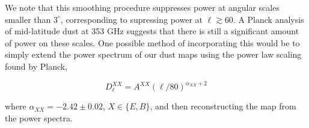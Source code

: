 \documentclass[twoside,10pt]{article}
\begin{document}
We note that this smoothing procedure suppresses power at angular scales
smaller than $3^\circ$, corresponding to supressing power at $\ell \gtrsim
60$. A Planck analysis\cite{planck_collaboration_planck_2014-2} of
mid-latitude dust at 353 GHz suggests that there is still a significant amount
of power on these scales. One possible method of incorporating this would be
to simply extend the power spectrum of our dust maps using the power law
scaling found by Planck,

\begin{equation}
    D_\ell^{X\!X} = A^{X\!X}(\ell/80)^{\alpha_{X\!X} + 2}
\end{equation}

where $\alpha_{X\!X} = -2.42 \pm 0.02$, $X \in \{E, B\}$, and then
reconstructing the map from the power spectra.



\end{document}

